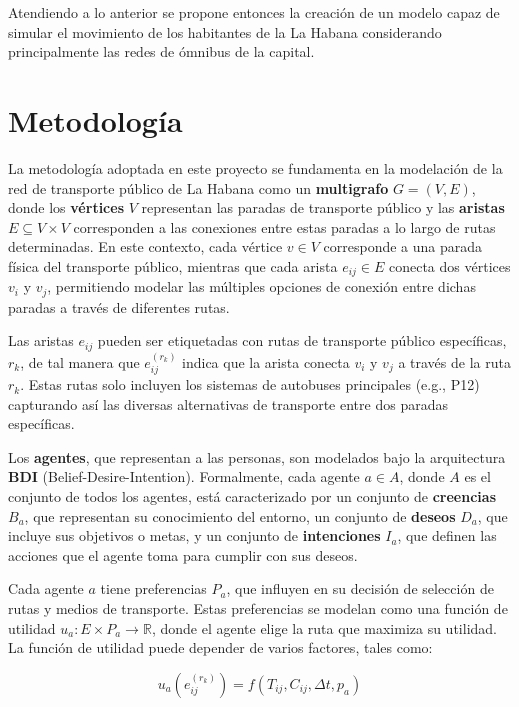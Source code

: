 \documentclass[a4paper,12pt]{article}
\begin{document}
Atendiendo a lo anterior se propone entonces la creaci\'on de un modelo capaz de simular el movimiento de los habitantes de la La Habana considerando principalmente las redes de \'omnibus de la capital. 

\section{Metodología}
La metodología adoptada en este proyecto se fundamenta en la modelación de la red de transporte público de La Habana como un \textbf{multigrafo} \( G = (V, E) \), donde los \textbf{vértices} \( V \) representan las paradas de transporte público y las \textbf{aristas} \( E \subseteq V \times V \) corresponden a las conexiones entre estas paradas a lo largo de rutas determinadas. En este contexto, cada vértice \( v \in V \) corresponde a una parada física del transporte público, mientras que cada arista \( e_{ij} \in E \) conecta dos vértices \( v_i \) y \( v_j \), permitiendo modelar las múltiples opciones de conexión entre dichas paradas a través de diferentes rutas.

Las aristas \( e_{ij} \) pueden ser etiquetadas con rutas de transporte público específicas, \( r_k \), de tal manera que \( e_{ij}^{(r_k)} \) indica que la arista conecta \( v_i \) y \( v_j \) a través de la ruta \( r_k \). Estas rutas solo incluyen los sistemas de autobuses principales (e.g., P12) capturando así las diversas alternativas de transporte entre dos paradas específicas.

Los \textbf{agentes}, que representan a las personas, son modelados bajo la arquitectura \textbf{BDI} (Belief-Desire-Intention). Formalmente, cada agente \( a \in A \), donde \( A \) es el conjunto de todos los agentes, está caracterizado por un conjunto de \textbf{creencias} \( B_a \), que representan su conocimiento del entorno, un conjunto de \textbf{deseos} \( D_a \), que incluye sus objetivos o metas, y un conjunto de \textbf{intenciones} \( I_a \), que definen las acciones que el agente toma para cumplir con sus deseos.

Cada agente \( a \) tiene preferencias \( P_a \), que influyen en su decisión de selección de rutas y medios de transporte. Estas preferencias se modelan como una función de utilidad \( u_a : E \times P_a \rightarrow \mathbb{R} \), donde el agente elige la ruta que maximiza su utilidad. La función de utilidad puede depender de varios factores, tales como:

\[
u_a(e_{ij}^{(r_k)}) = f(T_{ij}, C_{ij}, \Delta t, p_a)
\]
\end{document}
